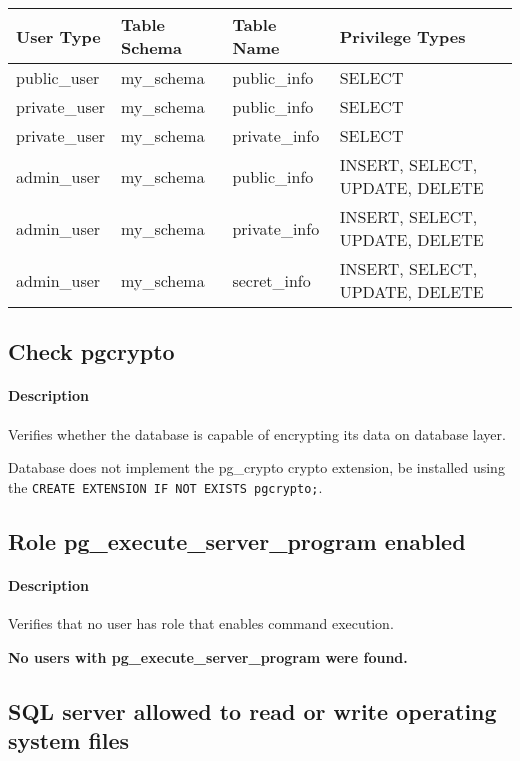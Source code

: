 \begin{tabular}{|l|l|l|l|}
\hline
\textbf{User Type} & \textbf{Table Schema} & \textbf{Table Name} & \textbf{Privilege Types} \\
\hline
public\_user & my\_schema & public\_info & SELECT \\
\hline
private\_user & my\_schema & public\_info & SELECT \\
\hline
private\_user & my\_schema & private\_info & SELECT \\
\hline
admin\_user & my\_schema & public\_info & INSERT, SELECT, UPDATE, DELETE \\
\hline
admin\_user & my\_schema & private\_info & INSERT, SELECT, UPDATE, DELETE \\
\hline
admin\_user & my\_schema & secret\_info & INSERT, SELECT, UPDATE, DELETE \\
\hline
\end{tabular}


\subsection{Check pgcrypto}
\paragraph{Description} Verifies whether the database is capable of encrypting its data on database layer.

Database does not implement the pg\_crypto crypto extension,
                                                            be installed using the \texttt{CREATE EXTENSION IF NOT EXISTS pgcrypto;}.



\subsection{Role pg\_execute\_server\_program enabled}
\paragraph{Description} Verifies that no user has role that enables command execution.

\textbf{No users with pg\_execute\_server\_program were found.}



\subsection{SQL server allowed to read or write operating system files}
